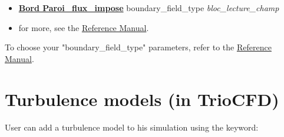 {{\begin{itemize}
\item \href{\REFERENCEMANUAL\#paroifluximpose}{\textbf{Bord Paroi\_flux\_impose}}                             boundary\_field\_type \textit{bloc\_lecture\_champ}
\item for more, see the \href{\REFERENCEMANUAL\#condlimbase}{\trustref Reference Manual}.
\end{itemize}
}}

To choose your "boundary\_field\_type" parameters, refer to the \href{\REFERENCEMANUAL\#frontfieldbase}{\trustref Reference Manual}.


\section{Turbulence models (in TrioCFD)}
User can add a turbulence model to his simulation using the keyword:
\begin{center}
\end{center}

